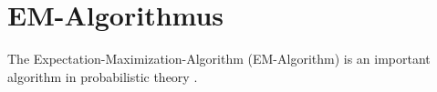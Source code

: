 \section{EM-Algorithmus}
\label{sec:em}
The Expectation-Maximization-Algorithm (EM-Algorithm) is an important algorithm in probabilistic theory \cite{Schwartz2014}.